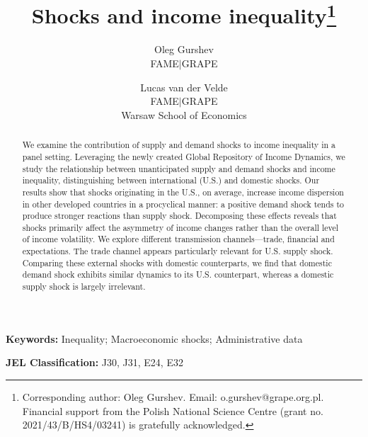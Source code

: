 \documentclass[12pt, a4paper]{article}
\title{Shocks and income inequality\thanks{Corresponding author: Oleg Gurshev. Email: o.gurshev@grape.org.pl.\\Financial support from the Polish National Science Centre (grant no. 2021/43/B/HS4/03241) is gratefully acknowledged.}}%
\author{
    Oleg Gurshev  \\ 
    \small{FAME$\mid$GRAPE} 
    \and 
    Lucas van der Velde \\ 
    \small{FAME$\mid$GRAPE} \\[-0.5em] 
    \small{Warsaw School of Economics}
}
\date{}
\begin{document}
\maketitle
\thispagestyle{empty}
\begin{abstract}
\noindent 
We examine the contribution of supply and demand shocks to income inequality in a panel setting. Leveraging the newly created Global Repository of Income Dynamics, we study the relationship between unanticipated supply and demand shocks and income inequality, distinguishing between international (U.S.) and domestic shocks. Our results show that shocks originating in the U.S., on average, increase income dispersion in other developed countries in a procyclical manner: a positive demand shock tends to produce stronger reactions than supply shock. Decomposing these effects reveals that shocks primarily affect the asymmetry of income changes rather than the overall level of income volatility. We explore different transmission channels—trade, financial and expectations. The trade channel appears particularly relevant for U.S. supply shock. Comparing these external shocks with domestic counterparts, we find that domestic demand shock exhibits similar dynamics to its U.S. counterpart, whereas a domestic supply shock is largely irrelevant.
\end{abstract}

\bigskip
\hspace*{15pt}\textbf{Keywords:} Inequality; Macroeconomic shocks; Administrative data
 
\hspace*{15pt}\textbf{JEL Classification:} J30, J31, E24, E32
\clearpage



\end{document}
